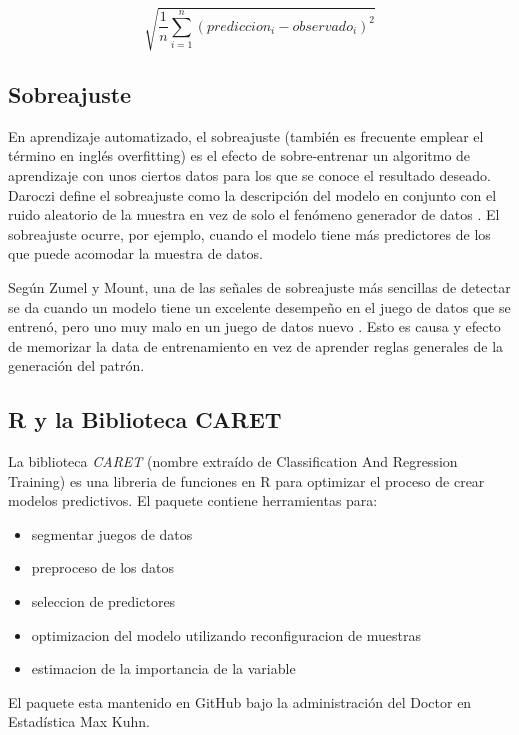 \begin{equation}
\sqrt{\frac{1}{n}\sum_{i=1}^n(prediccion_{i} - observado_{i})^{2}}
\end{equation}

\subsection{Sobreajuste}
En aprendizaje automatizado, el sobreajuste (también es frecuente emplear el término en inglés overfitting) es el efecto de sobre-entrenar un algoritmo de aprendizaje con unos ciertos datos para los que se conoce el resultado deseado. Daroczi define el sobreajuste como la descripción del modelo en conjunto con el ruido aleatorio de la muestra en vez de solo el fenómeno generador de datos \cite{daroczi}. El sobreajuste ocurre, por ejemplo, cuando el modelo tiene más predictores de los que puede acomodar la muestra de datos.

Según Zumel y Mount, una de las señales de sobreajuste más sencillas de detectar se da cuando un modelo tiene un excelente desempeño en el juego de datos que se entrenó, pero uno muy malo en un juego de datos nuevo \cite{zumelMount}. Esto es causa y efecto de memorizar la data de entrenamiento en vez de aprender reglas generales de la generación del patrón. 

\subsection{R y la Biblioteca CARET}
La biblioteca \emph{CARET} (nombre extraído de Classification And Regression Training) es una libreria de funciones en R para optimizar el proceso de crear modelos predictivos. El paquete contiene herramientas para:

\begin{itemize}
	\item segmentar juegos de datos
	\item preproceso de los datos
	\item seleccion de predictores
	\item optimizacion del modelo utilizando reconfiguracion de muestras
	\item estimacion de la importancia de la variable
\end{itemize}

El paquete esta mantenido en GitHub bajo la administración del Doctor en Estadística Max Kuhn. 
